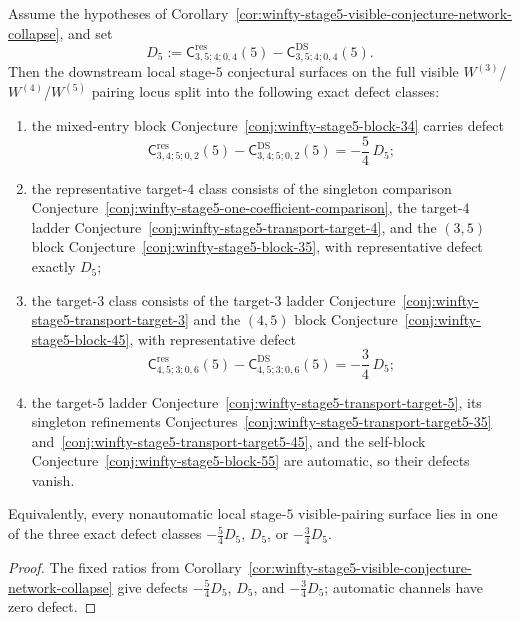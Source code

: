 \begin{corollary}
\label{cor:winfty-stage5-visible-defect-classes}
Assume the hypotheses of
Corollary~\ref{cor:winfty-stage5-visible-conjecture-network-collapse},
and set
\[
D_5:=
\mathsf{C}^{\mathrm{res}}_{3,5;4;0,4}(5)
-
\mathsf{C}^{\mathrm{DS}}_{3,5;4;0,4}(5).
\]
Then the downstream local stage-$5$ conjectural surfaces on the full
visible
\texorpdfstring{$W^{(3)}$}{W3}/\texorpdfstring{$W^{(4)}$}{W4}/\texorpdfstring{$W^{(5)}$}{W5}
pairing locus split into the following exact defect classes:
\begin{enumerate}[label=\textup{(\roman*)}]
\item the mixed-entry block
  Conjecture~\ref{conj:winfty-stage5-block-34} carries defect
  \[
  \mathsf{C}^{\mathrm{res}}_{3,4;5;0,2}(5)
  -
  \mathsf{C}^{\mathrm{DS}}_{3,4;5;0,2}(5)
  =
  -\frac{5}{4}\,D_5;
  \]
\item the representative target-$4$ class consists of the singleton
  comparison
  Conjecture~\ref{conj:winfty-stage5-one-coefficient-comparison}, the
  target-$4$ ladder
  Conjecture~\ref{conj:winfty-stage5-transport-target-4}, and the
  \texorpdfstring{$(3,5)$}{(3,5)} block
  Conjecture~\ref{conj:winfty-stage5-block-35}, with representative
  defect exactly \(D_5\);
\item the target-$3$ class consists of the target-$3$ ladder
  Conjecture~\ref{conj:winfty-stage5-transport-target-3} and the
  \texorpdfstring{$(4,5)$}{(4,5)} block
  Conjecture~\ref{conj:winfty-stage5-block-45}, with representative
  defect
  \[
  \mathsf{C}^{\mathrm{res}}_{4,5;3;0,6}(5)
  -
  \mathsf{C}^{\mathrm{DS}}_{4,5;3;0,6}(5)
  =
  -\frac{3}{4}\,D_5;
  \]
\item the target-$5$ ladder
  Conjecture~\ref{conj:winfty-stage5-transport-target-5}, its singleton
  refinements
  Conjectures~\ref{conj:winfty-stage5-transport-target5-35}
  and~\ref{conj:winfty-stage5-transport-target5-45},
  and the self-block
  Conjecture~\ref{conj:winfty-stage5-block-55}
  are automatic, so their defects vanish.
\end{enumerate}
Equivalently, every nonautomatic local stage-$5$ visible-pairing
surface lies in one of the three exact defect classes
\(-\tfrac54 D_5\), \(D_5\), or \(-\tfrac34 D_5\).
\end{corollary}

\begin{proof}
The fixed ratios from Corollary~\ref{cor:winfty-stage5-visible-conjecture-network-collapse} give defects \(-\tfrac54 D_5\), \(D_5\), and \(-\tfrac34 D_5\); automatic channels have zero defect.
\end{proof}

